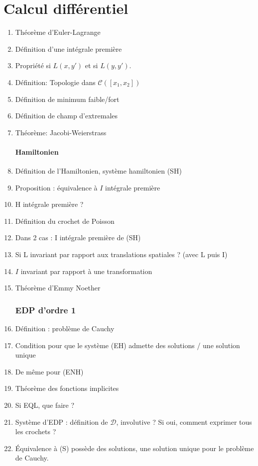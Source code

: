 \documentclass{article}
\begin{document}
\part{Calcul différentiel}
\begin{enumerate}
\section{Calcul variationnel}
\subsection{Euler-Lagrange}
	\item Théorème d'Euler-Lagrange
	\item Définition d'une intégrale première
	\item Propriété si $L(x,y')$ et si $L(y,y')$.
	\item Définition: Topologie dans $\mathcal{C}([x_1 , x_2])$
	\item Définition de minimum faible/fort
	\item Définition de champ d'extremales
	\item Théorème: Jacobi-Weierstrass
\subsection{Hamiltonien}
	\item Définition de l'Hamiltonien, système hamiltonien (SH)
	\item Proposition : équivalence à $I$ intégrale première
	\item H intégrale première ?
	\item Définition du crochet de Poisson
	\item Dans 2 cas : I intégrale première de (SH)
	\item Si L invariant par rapport aux translations spatiales ? (avec L puis I)
	\item $I$ invariant par rapport à une transformation
	\item Théorème d'Emmy Noether
\section{EDP d'ordre 1}
	\item Définition : problème de Cauchy
	\item Condition pour que le système (EH) admette des solutions / une solution unique
	\item De même pour (ENH)
	\item Théorème des fonctions implicites
	\item Si EQL, que faire ?
	\item Système d'EDP : définition de $\mathcal{D}$, involutive ? Si oui, comment exprimer tous les crochets ?
	\item Équivalence à (S) possède des solutions, une solution unique pour le problème de Cauchy.
\end{enumerate}
\end{document}
